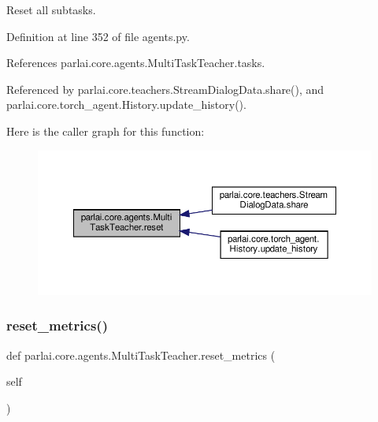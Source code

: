 \begin{DoxyVerb}Reset all subtasks.\end{DoxyVerb}
 

Definition at line 352 of file agents.\+py.



References parlai.\+core.\+agents.\+Multi\+Task\+Teacher.\+tasks.



Referenced by parlai.\+core.\+teachers.\+Stream\+Dialog\+Data.\+share(), and parlai.\+core.\+torch\+\_\+agent.\+History.\+update\+\_\+history().

Here is the caller graph for this function\+:
\nopagebreak
\begin{figure}[H]
\begin{center}
\leavevmode
\includegraphics[width=350pt]{classparlai_1_1core_1_1agents_1_1MultiTaskTeacher_ae4eeda38c4164498018ee6515050ae43_icgraph}
\end{center}
\end{figure}
\mbox{\label{classparlai_1_1core_1_1agents_1_1MultiTaskTeacher_a78eb3c163a158deda3bb6bd9000fcee2}} 
\subsubsection{\texorpdfstring{reset\+\_\+metrics()}{reset\_metrics()}}
{\footnotesize\ttfamily def parlai.\+core.\+agents.\+Multi\+Task\+Teacher.\+reset\+\_\+metrics (\begin{DoxyParamCaption}\item[{}]{self }\end{DoxyParamCaption})}

